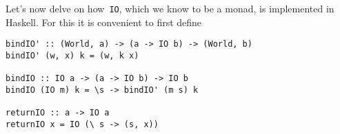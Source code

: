 \documentclass[../TFG.tex]{subfiles}
\begin{document}
Let's now delve on how~\texttt{IO}, which we know to be a monad, is
implemented in Haskell. For this it is convenient to first define
\begin{verbatim}
bindIO' :: (World, a) -> (a -> IO b) -> (World, b)
bindIO' (w, x) k = (w, k x)

bindIO :: IO a -> (a -> IO b) -> IO b
bindIO (IO m) k = \s -> bindIO' (m s) k

returnIO :: a -> IO a
returnIO x = IO (\ s -> (s, x))
\end{verbatim}
\end{document}
